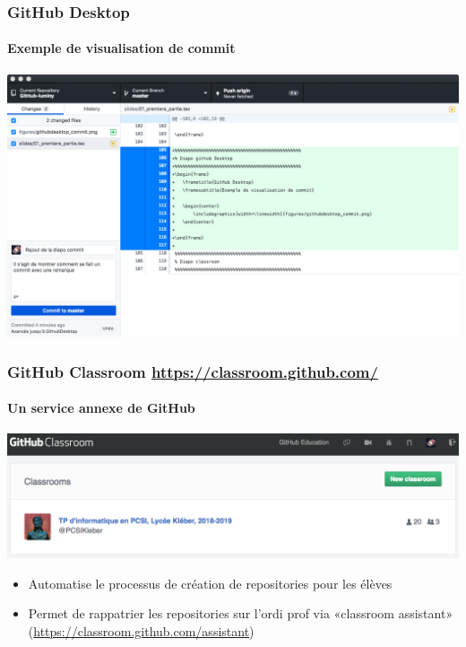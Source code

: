 \begin{frame}
	\frametitle{GitHub Desktop}
	\framesubtitle{Exemple de visualisation de commit}

	\begin{center}
		\includegraphics[width=\linewidth]{figures/githubdesktop_commit.png}
	\end{center}

\end{frame}

\begin{frame}
	\frametitle{GitHub Classroom \url{https://classroom.github.com/}}
	\framesubtitle{Un service annexe de GitHub}

	\begin{center}
		\includegraphics[width=\linewidth]{figures/classroom_accueil.png}
	\end{center}

	\begin{itemize}[<+->]
		\item Automatise le processus de création de repositories pour les élèves

		\item Permet de rappatrier les repositories sur l'ordi prof via «classroom assistant» (\url{https://classroom.github.com/assistant})

	\end{itemize}



\end{frame}
